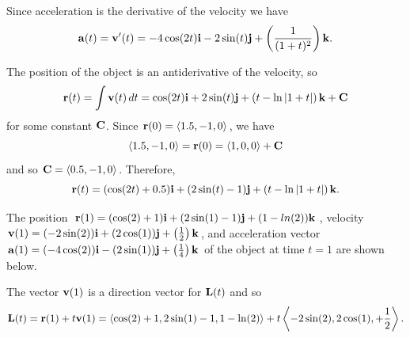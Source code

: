 \begin{bighint}

\end{bighint}
\begin{activitySolution}
	\ba
	\item Since acceleration is the derivative of the velocity we have 
\[\mathbf{a}(t) = \mathbf{v}'(t) = -4\cos(2t)\mathbf{i} -2\sin(t) \mathbf{j} + \left(\frac{1}{(1+t)^2}\right) \mathbf{k}.\]

	\item The position of the object is an antiderivative of the velocity, so 
\[\mathbf{r}(t) = \int \mathbf{v}(t) \, dt = \cos(2t) \mathbf{i} + 2\sin(t) \mathbf{j} + \left( t - \ln|1+t| \right) \mathbf{k} + \mathbf{C}\]
for some constant $\mathbf{C}$. Since $\mathbf{r}(0) = \langle 1.5, -1, 0 \rangle$, we have 
\[\langle 1.5, -1, 0 \rangle = \mathbf{r}(0) = \langle 1, 0, 0 \rangle + \mathbf{C}\]
and so $\mathbf{C} = \langle 0.5, -1, 0 \rangle$. Therefore,
\[\mathbf{r}(t) = (\cos(2t)+0.5) \mathbf{i} + (2\sin(t)-1) \mathbf{j} + \left( t - \ln|1+t| \right) \mathbf{k}.\]
	\item The position $\mathbf{r}(1) = (\cos(2)+1) \mathbf{i} + (2\sin(1)-1) \mathbf{j} + (1-ln(2)) \mathbf{k}$, velocity $\mathbf{v}(1) = (-2\sin(2)) \mathbf{i} + (2\cos(1)) \mathbf{j} + \left(\frac{1}{2}\right) \mathbf{k}$, and acceleration vector $\mathbf{a}(1) = (-4\cos(2)) \mathbf{i} - (2\sin(1)) \mathbf{j} + \left(\frac{1}{4}\right) \mathbf{k}$ of the object at time $t=1$ are shown below. 
\begin{center}
\end{center}
	\item The vector $\mathbf{v}(1)$ is a direction vector for $\mathbf{L}(t)$ and so
\[\mathbf{L}(t) = \mathbf{r}(1) + t\mathbf{v}(1) = \langle \cos(2)+1, 2\sin(1)-1, 1-\ln(2) \rangle + t \left\langle -2\sin(2), 2\cos(1), + \frac{1}{2} \right\rangle.\]


	\ea
\end{activitySolution}
\aftera
